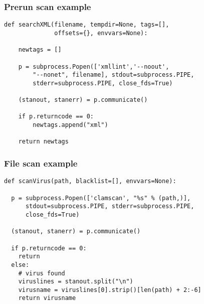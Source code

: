 \documentclass[11pt]{beamer}
\begin{document}
\begin{frame}[fragile]
\frametitle{Prerun scan example}
\begin{verbatim}
def searchXML(filename, tempdir=None, tags=[],
              offsets={}, envvars=None):

    newtags = []

    p = subprocess.Popen(['xmllint','--noout',
        "--nonet", filename], stdout=subprocess.PIPE,
        stderr=subprocess.PIPE, close_fds=True)

    (stanout, stanerr) = p.communicate()

    if p.returncode == 0:
        newtags.append("xml")

    return newtags
\end{verbatim}
\end{frame}



\begin{frame}[fragile]
\frametitle{File scan example}
\begin{verbatim}
def scanVirus(path, blacklist=[], envvars=None):

  p = subprocess.Popen(['clamscan', "%s" % (path,)],
      stdout=subprocess.PIPE, stderr=subprocess.PIPE,
      close_fds=True)

  (stanout, stanerr) = p.communicate()

  if p.returncode == 0:
    return
  else:
    # virus found
    viruslines = stanout.split("\n")
    virusname = viruslines[0].strip()[len(path) + 2:-6]
    return virusname
\end{verbatim}
\end{frame}
\end{document}
